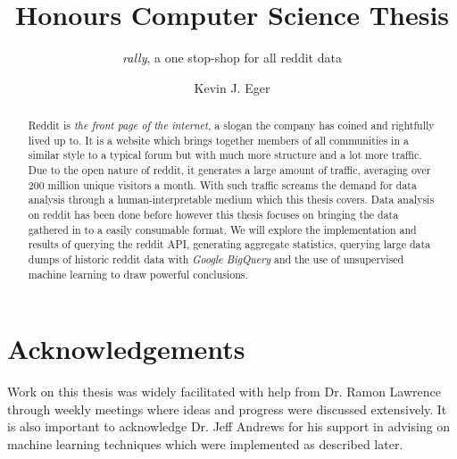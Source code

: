 \documentclass[msc,oneside]{ubcthesis}%
\title{Honours Computer Science Thesis}
\subtitle{\emph{rally}, a one stop-shop for all reddit data}
\author{Kevin J. Eger}
\begin{document}
\frontmatter                    %

\maketitle                      %

\begin{abstract}                %
Reddit is \emph{the front page of the internet}, a slogan the company has coined and rightfully lived up to. It is a website which brings together members of all communities in a similar style to a typical forum but with much more structure and a lot more traffic. Due to the open nature of reddit, it generates a large amount of traffic, averaging over 200 million unique visitors a month. With such traffic screams the demand for data analysis through a human-interpretable medium which this thesis covers. Data analysis on reddit has been done before however this thesis focuses on bringing the data gathered in to a easily consumable format. We will explore the implementation and results of querying the reddit API, generating aggregate statistics, querying large data dumps of historic reddit data with \emph{Google BigQuery} and the use of unsupervised machine learning to draw powerful conclusions.
\end{abstract}

\newpage
{} \label{tableofcontent}%
\tableofcontents                %
\newpage 
{} \label{listoftab}%
\listoftables                   %
\newpage
{} \label{listoffig}%
\listoffigures                  %


\chapter{Acknowledgements}      %
Work on this thesis was widely facilitated with help from Dr. Ramon Lawrence through weekly meetings where ideas and progress were discussed extensively. It is also important to acknowledge Dr. Jeff Andrews for his support in advising on machine learning techniques which were implemented as described later.
\end{document}
